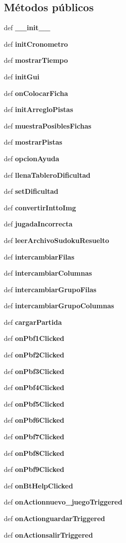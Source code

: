 \subsection*{Métodos públicos}
\begin{DoxyCompactItemize}
\item 
def {\bf \-\_\-\-\_\-init\-\_\-\-\_\-}
\item 
def {\bf init\-Cronometro}
\item 
def {\bf mostrar\-Tiempo}
\item 
def {\bf init\-Gui}
\item 
def {\bf on\-Colocar\-Ficha}
\item 
def {\bf init\-Arreglo\-Pistas}
\item 
def {\bf muestra\-Posibles\-Fichas}
\item 
def {\bf mostrar\-Pistas}
\item 
def {\bf opcion\-Ayuda}
\item 
def {\bf llena\-Tablero\-Dificultad}
\item 
def {\bf set\-Dificultad}
\item 
def {\bf convertir\-Intto\-Img}
\item 
def {\bf jugada\-Incorrecta}
\item 
def {\bf leer\-Archivo\-Sudoku\-Resuelto}
\item 
def {\bf intercambiar\-Filas}
\item 
def {\bf intercambiar\-Columnas}
\item 
def {\bf intercambiar\-Grupo\-Filas}
\item 
def {\bf intercambiar\-Grupo\-Columnas}
\item 
def {\bfseries cargar\-Partida}\label{classsudoku_1_1_sudoku_a686faf15eb72b43e46b639ca832c4f2f}

\item 
def {\bf on\-Pbf1\-Clicked}
\item 
def {\bf on\-Pbf2\-Clicked}
\item 
def {\bf on\-Pbf3\-Clicked}
\item 
def {\bf on\-Pbf4\-Clicked}
\item 
def {\bf on\-Pbf5\-Clicked}
\item 
def {\bf on\-Pbf6\-Clicked}
\item 
def {\bf on\-Pbf7\-Clicked}
\item 
def {\bf on\-Pbf8\-Clicked}
\item 
def {\bf on\-Pbf9\-Clicked}
\item 
def {\bf on\-Bt\-Help\-Clicked}
\item 
def {\bf on\-Actionnuevo\-\_\-juego\-Triggered}
\item 
def {\bf on\-Actionguardar\-Triggered}
\item 
def {\bf on\-Actionsalir\-Triggered}
\end{DoxyCompactItemize}
